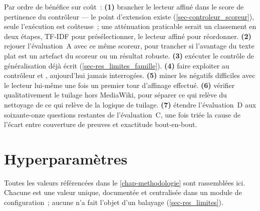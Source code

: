 Par ordre de bénéfice sur coût~: \textbf{(1)} brancher le lecteur affiné dans
le score de pertinence du contrôleur --- le point d'extension existe
(\cref{sec-controleur_scoreur}), seule l'exécution est coûteuse~; une
atténuation praticable serait un classement en deux étapes, TF-IDF pour
présélectionner, le lecteur affiné pour réordonner. \textbf{(2)} rejouer
l'évaluation~A avec ce même scoreur, pour trancher si l'avantage du texte
plat est un artefact du scoreur ou un résultat robuste. \textbf{(3)} exécuter
le contrôle de généralisation déjà écrit (\cref{sec-res_limites_famille}).
\textbf{(4)} faire exploiter au contrôleur  et
, aujourd'hui jamais interrogées. \textbf{(5)} miner
les négatifs difficiles avec le lecteur lui-même une fois un premier tour
d'affinage effectué. \textbf{(6)} vérifier qualitativement le tuilage hors
MediaWiki, pour séparer ce qui relève du nettoyage de ce qui relève de la
logique de tuilage. \textbf{(7)} étendre l'évaluation~D aux
soixante-onze questions restantes de l'évaluation~C, une fois triée la cause
de l'écart entre couverture de preuves et exactitude bout-en-bout.

\chapter{Hyperparamètres}
\label{annexe-hyperparams}

Toutes les valeurs référencées dans le \cref{chap-methodologie} sont rassemblées
ici. Chacune est une valeur unique, documentée et centralisée dans un module de
configuration~; aucune n'a fait l'objet d'un balayage
(\cref{sec-res_limites}).

